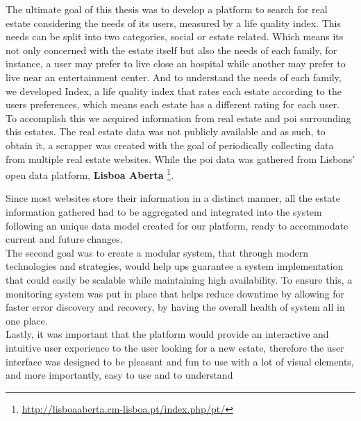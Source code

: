     

The ultimate goal of this thesis was to develop a platform to search for real estate considering the needs of its users, measured by a life quality index. This needs can be split into two categories, social or estate related. Which means its not only concerned with the estate itself but also the needs of each family, for instance, a user may prefer to live close an hospital while another may prefer to live near an entertainment center. And to understand the needs of each family, we developed Index, a life quality index that rates each estate according to the users preferences, which means each estate has a different rating for each user. \\

To accomplish this we acquired information from real estate and \acrfull{poi} surrounding this estates. The real estate data was not publicly available and as such, to obtain it, a scrapper was created with the goal of periodically collecting data from multiple real estate websites. While the \acrshort{poi} data was gathered from Lisbons' open data platform, \textbf{Lisboa Aberta} \footnote{\url{http://lisboaaberta.cm-lisboa.pt/index.php/pt/}}. 

Since most websites store their information in a distinct manner, all the estate information gathered had to be aggregated and integrated into the system following an unique data model created for our platform, ready to accommodate current and future changes. \\

The second goal was to create a modular system, that through modern technologies and strategies, would help ups guarantee a system implementation that could easily be scalable while maintaining high availability. To ensure this, a monitoring system was put in place that helps reduce downtime by allowing for faster error discovery and recovery, by having the overall health of system all in one place. \\

Lastly, it was important that the platform would provide an interactive and intuitive user experience to the user looking for a new estate, therefore the user interface was designed to be pleasant and fun to use with a lot of visual elements, and more importantly, easy to use and to understand


